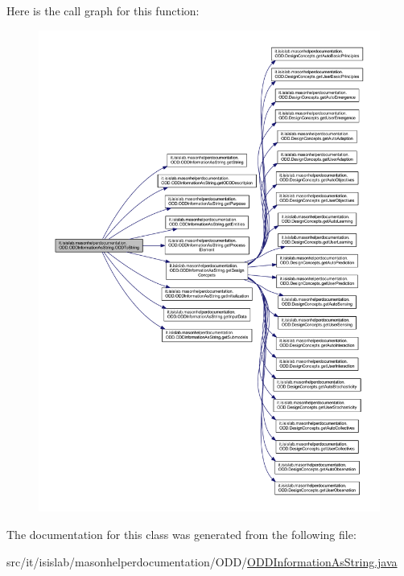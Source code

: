 Here is the call graph for this function\-:\nopagebreak
\begin{figure}[H]
\begin{center}
\leavevmode
\includegraphics[width=350pt]{classit_1_1isislab_1_1masonhelperdocumentation_1_1_o_d_d_1_1_o_d_d_information_as_string_ab8dcbc3306a8622fe5f4b547e9b68a32_cgraph}
\end{center}
\end{figure}




The documentation for this class was generated from the following file\-:\begin{DoxyCompactItemize}
\item 
src/it/isislab/masonhelperdocumentation/\-O\-D\-D/\hyperlink{_o_d_d_information_as_string_8java}{O\-D\-D\-Information\-As\-String.\-java}\end{DoxyCompactItemize}
